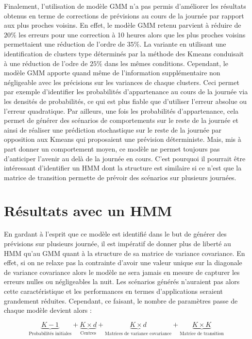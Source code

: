 \documentclass[12pt]{report}
\begin{document}
Finalement, l'utilisation de modèle GMM n'a pas permis d'améliorer les résultats obtenus en terme de corrections de prévisions au cours de la journée par rapport aux plus proches voisins. En effet, le modèle GMM retenu parvient à réduire de $20 \%$ les erreurs pour une correction à 10 heures alors que les plus proches voisins permettaient une réduction de l'ordre de $35 \%$. La variante en utilisant une identification de clusters type déterminés par la méthode des Kmeans conduisait à une réduction de l'odre de $25 \%$ dans les mêmes conditions. Cependant, le modèle GMM apporte quand même de l'information supplémentaire non négligeable avec les précisions sur les variances de chaque clusters. Ceci permet par exemple d'identifier les probabilités d'appartenance au cours de la journée via les densités de probabilités, ce qui est plus fiable que d'utiliser l'erreur absolue ou l'erreur quadratique. Par ailleurs, une fois les probabilités d'appartenance, cela permet de générer des scénarios de comportements sur le reste de la journée et ainsi de réaliser une prédiction stochastique sur le reste de la journée par opposition aux Kmeans qui proposaient une prévision déterministe. Mais, mis à part donner un comportement moyen, ce modèle ne permet toujours pas d'anticiper l'avenir au delà de la journée en cours. C'est pourquoi il pourrait être intéressant d'identifier un HMM dont la structure est similaire si ce n'est que la matrice de transition permette de prévoir des scénarios sur plusieurs journées.  

\section{Résultats avec un HMM}
\label{sec:PV_HMM}

En gardant à l'esprit que ce modèle est identifié dans le but de générer des prévisions sur plusieurs journée, il est impératif de donner plus de liberté au HMM qu'au GMM quant à la structure de sa matrice de variance covariance. En effet, si on ne relaxe pas la contrainte d'avoir une valeur unique sur la diagonale de variance covariance alors le modèle ne sera jamais en mesure de capturer les erreurs nulles ou négligeables la nuit. Les scénarios générés n'auraient pas alors cette caractéristique et les performances en termes d'applications seraient grandement réduites. Cependant, ce faisant, le nombre de paramètres passe de chaque modèle devient alors :

\begin{equation}
\underbrace{K-1}_\text{Probabilités initiales}  + \underbrace{K \times d}_\text{Centres}  +  \underbrace{K \times d}_\text{Matrices de variance covariance} + \underbrace{K \times K}_\text{Matrice de transition}
\end{equation}
\end{document}

